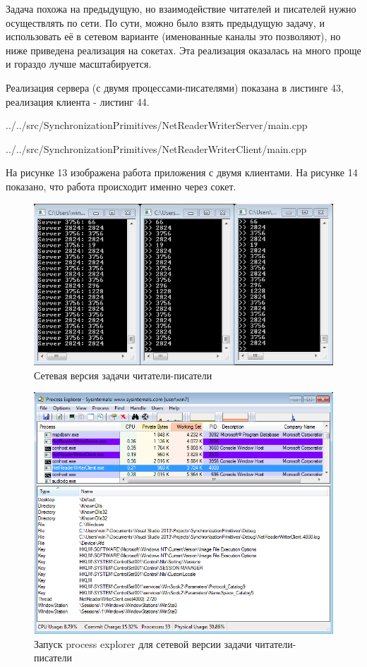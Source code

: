 \documentclass[a4paper, 12pt]{article}		%
\begin{document}
Задача похожа на предыдущую, но взаимодействие читателей и писателей нужно осуществлять по сети\cite{Dushutina}. По сути, можно было взять предыдущую задачу, и использовать её в сетевом варианте (именованные каналы это позволяют), но ниже приведена реализация на сокетах. Эта реализация оказалась на много проще и гораздо лучше масштабируется.

Реализация сервера (с двумя процессами-писателями) показана в листинге 43, реализация клиента - листинг 44.


{../../src/SynchronizationPrimitives/NetReaderWriterServer/main.cpp}


{../../src/SynchronizationPrimitives/NetReaderWriterClient/main.cpp}

На рисунке 13 изображена работа приложения с двумя клиентами. На рисунке 14 показано, что работа происходит именно через сокет.
\newpage

\begin{figure}[h!]
\centering
\includegraphics[scale=0.7]{res/013}
\caption{Сетевая версия задачи читатели-писатели}
\end{figure}

\begin{figure}[h!]
\centering
\includegraphics[scale=0.6]{res/pe_13}
\caption{Запуск process explorer для сетевой версии задачи читатели-писатели}
\end{figure}
\end{document}
